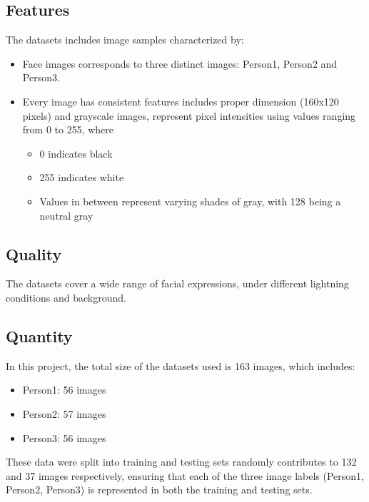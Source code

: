 \subsection{Features}
The datasets includes image samples characterized by:
\begin{itemize}
	\item Face images corresponds to three distinct images: Person1, Person2 and Person3.
	\item Every image has consistent features includes proper dimension (160x120 pixels) and grayscale images, represent pixel intensities using values ranging from 0 to 255, where
	\begin{itemize}
		\item 0 indicates black
		\item 255 indicates white
		\item Values in between represent varying shades of gray, with 128 being a neutral gray
	\end{itemize}
\end{itemize}

\subsection{Quality}
The datasets cover a wide range of facial expressions, under different lightning conditions and background.

\subsection{Quantity}
In this project, the total size of the datasets used is 163 images, which includes:
\begin{itemize}
	\item Person1: 56 images
	\item Person2: 57 images
	\item Person3: 56 images
\end{itemize}

These data were split into training and testing sets randomly contributes to 132 and 37 images respectively, ensuring that each of the three image labels (Person1, Person2, Person3) is represented in both the training and testing sets.

